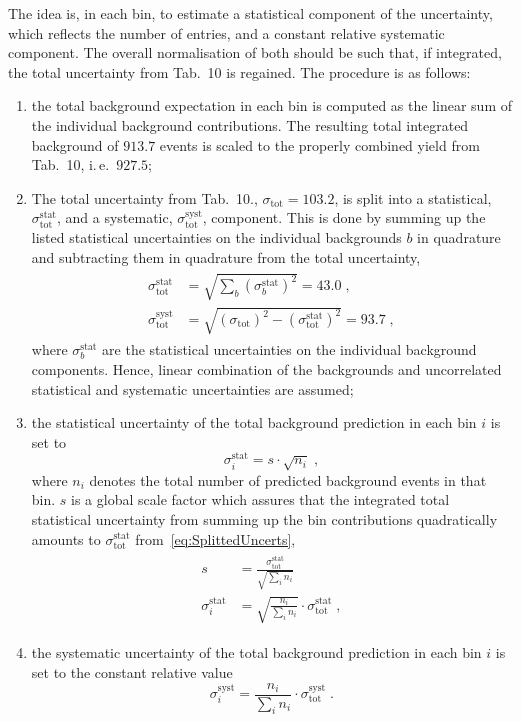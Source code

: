 \documentclass[a4paper]{article}
\newcommand{\sigmatot}{\ensuremath{\sigma_{\text{tot}}}\xspace}
\newcommand{\sigmatotstat}{\ensuremath{\sigma^{\text{stat}}_{\text{tot}}}\xspace}
\newcommand{\sigmatotsyst}{\ensuremath{\sigma^{\text{syst}}_{\text{tot}}}\xspace}
\newcommand{\sigmastati}[1]{\ensuremath{\sigma^{\text{stat}}_{#1}}\xspace}
\newcommand{\sigmasysti}[1]{\ensuremath{\sigma^{\text{syst}}_{#1}}\xspace}
\begin{document}
The idea is, in each bin, to estimate a statistical component of the uncertainty, which reflects the number of entries, and a constant relative systematic component.
The overall normalisation of both should be such that, if integrated, the total uncertainty from Tab.~10 is regained.
The procedure is as follows:
\begin{enumerate}
\item the total background expectation in each bin is computed as the linear sum of the individual background contributions.
  The resulting total integrated background of $913.7$ events is scaled to the properly combined yield from Tab.~10, i.\,e.\ $927.5$;
\item The total uncertainty from Tab.~10., \mbox{$\sigmatot=103.2$}, is split into a statistical, \sigmatotstat, and a systematic, \sigmatotsyst, component.
  This is done by summing up the listed statistical uncertainties on the individual backgrounds $b$ in quadrature and subtracting them in quadrature from the total uncertainty,
  \begin{align}
    \begin{split}
      \label{eq:SplittedUncerts}
      \sigmatotstat & = \sqrt{ \sum_{b}\left(\sigmastati{b}\right)^{2} } = 43.0\;, \\
      \sigmatotsyst & = \sqrt{ \left(\sigmatot\right)^{2} - \left(\sigmatotstat\right)^{2} } = 93.7\;,
    \end{split}
  \end{align}
  where \sigmastati{b} are the statistical uncertainties on the individual background components.
  Hence, linear combination of the backgrounds and uncorrelated statistical and systematic uncertainties are assumed;
\item the statistical uncertainty of the total background prediction in each bin $i$ is set to
  \begin{equation}
    \label{eq:BinStatUncert}
    \sigmastati{i} = s\cdot\sqrt{n_{i}}\;,
  \end{equation}
  where $n_{i}$ denotes the total number of predicted background events in that bin.
  $s$ is a global scale factor which assures that the integrated total statistical uncertainty from summing up the bin contributions quadratically amounts to \sigmatotstat from~\eqref{eq:SplittedUncerts},
  \begin{align}
    \begin{split}
      \label{eq:ScaleFactor}
      s &= \frac{\sigmatotstat}{\sqrt{\sum_{i}n_{i}}} \\
      \sigmastati{i} &= \sqrt{\frac{n_{i}}{\sum_{i}n_{i}}}\cdot\sigmatotstat \;,
    \end{split}
  \end{align}
\item the systematic uncertainty of the total background prediction in each bin $i$ is set to the constant relative value
  \begin{equation}
    \label{eq:BinSystUncert}
    \sigmasysti{i} = \frac{n_{i}}{\sum_{i}n_{i}}\cdot\sigmatotsyst \;.
  \end{equation}
\end{enumerate}
\end{document}

